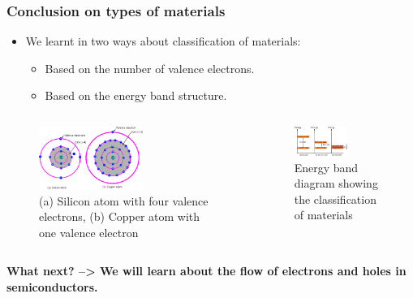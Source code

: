\begin{frame}
	\frametitle{Conclusion on types of materials}
    \begin{itemize}
    \item We learnt in two ways about classification of materials:
        \begin{itemize}
            \item Based on the number of valence electrons.
            \item Based on the energy band structure.
        \end{itemize}
    \end{itemize}
    \begin{columns}
        \begin{column}{0.6\textwidth}
            \begin{figure}
                \centering
                \includegraphics[width=0.6\textwidth]{fig/lec02/Cu_Si_atom1.pdf}
                \caption{(a) Silicon atom with four valence electrons, (b) Copper atom with one valence electron}
            \end{figure}
        \end{column}
        \hfill
        \begin{column}{0.4\textwidth}
            \begin{figure}
                \centering
                \includegraphics[width=0.6\textwidth]{fig/lec02/band_diagram.pdf}
                \caption{Energy band diagram showing the classification of materials}
            \end{figure}
        \end{column}
\end{columns}
\textbf{What next? --> We will learn about the flow of electrons and holes in semiconductors.}
\end{frame}

